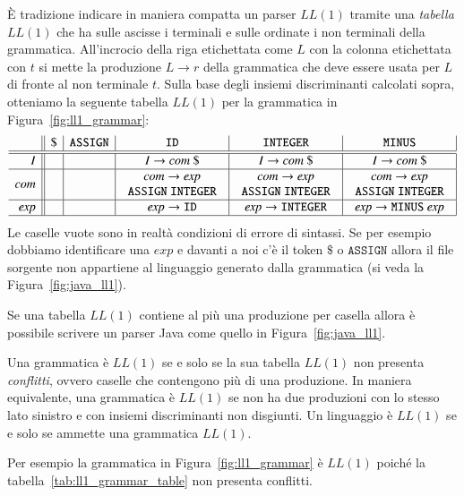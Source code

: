 \`E tradizione indicare in maniera compatta un parser $\mathit{LL}(1)$ tramite
una \emph{tabella $\mathit{LL}(1)$} che ha sulle ascisse i terminali
e sulle ordinate i non terminali della grammatica. All'incrocio della
riga etichettata come $L$ con la colonna etichettata con $t$ si mette
la produzione $L\to r$ della grammatica che deve essere usata per $L$
di fronte al non terminale $t$.
Sulla base degli insiemi discriminanti calcolati sopra, otteniamo la seguente
tabella $\mathit{LL}(1)$
per la grammatica in Figura~\ref{fig:ll1_grammar}:
%
\begin{equation}\label{tab:ll1_grammar_table}
\begin{array}{r||c|c|c|c|c|}
 & \mathtt{\$} & \mathtt{ASSIGN} & \mathtt{ID} & \mathtt{INTEGER} & \mathtt{MINUS}\\\hline\hline
\mathit{I} & & & I\to\mathit{com}\ \$ & I\to\mathit{com}\ \$ &
  I\to\mathit{com}\ \$ \\\hline
\mathit{com} & & & \begin{array}{c}\mathit{com}\to\mathit{exp}\\\mathtt{ASSIGN}\ \mathtt{INTEGER}\end{array} & \begin{array}{c}\mathit{com}\to\mathit{exp}\\\mathtt{ASSIGN}\ \mathtt{INTEGER}\end{array} & \begin{array}{c}\mathit{com}\to\mathit{exp}\\\mathtt{ASSIGN}\ \mathtt{INTEGER}\end{array}\\\hline
\mathit{exp} & & & \mathit{exp}\to\mathtt{ID} &
  \mathit{exp}\to\mathtt{INTEGER} & \mathit{exp}\to\mathtt{MINUS}\ \mathit{exp}
\\\hline
\end{array}
\end{equation}
%
Le caselle vuote sono in realt\`a condizioni di errore di sintassi. Se
per esempio dobbiamo identificare una $\mathit{exp}$ e davanti a noi
c'\`e il token $\mathtt{\$}$ o $\mathtt{ASSIGN}$ allora il file sorgente
non appartiene al linguaggio generato dalla grammatica
(si veda la Figura~\ref{fig:java_ll1}).

Se una tabella $\mathit{LL}(1)$
contiene al pi\`u una produzione per casella allora
\`e possibile scrivere un parser Java come quello in Figura~\ref{fig:java_ll1}.
%
\begin{definition}\label{def:ll1_grammar}
Una grammatica \`e $\mathit{LL}(1)$
se e solo se la sua tabella $\mathit{LL}(1)$ non presenta
\emph{conflitti}, ovvero caselle che contengono pi\`u di una produzione.
In maniera equivalente, una grammatica \`e $\mathit{LL}(1)$ se non ha due
produzioni con lo stesso lato sinistro e con
insiemi discriminanti non disgiunti.
Un linguaggio \`e $\mathit{LL}(1)$ se e solo se ammette una grammatica
$\mathit{LL}(1)$.
\end{definition}
%
\noindent
Per esempio la grammatica in Figura~\ref{fig:ll1_grammar} \`e $\mathit{LL}(1)$
poich\'e la tabella~\eqref{tab:ll1_grammar_table} non presenta conflitti.

